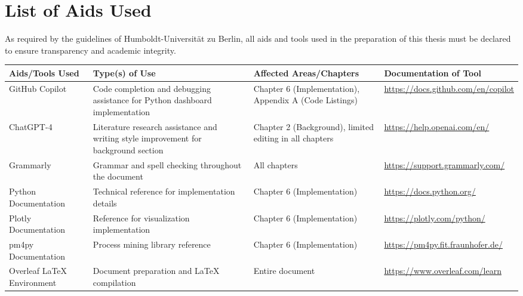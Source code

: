 
\chapter*{List of Aids Used}

As required by the guidelines of Humboldt-Universität zu Berlin, all aids and tools used in the preparation of this thesis must be declared to ensure transparency and academic integrity.

\vspace{1cm}

\begin{longtable}{|p{3cm}|p{4cm}|p{3cm}|p{4cm}|}
\hline
\textbf{Aids/Tools Used} & \textbf{Type(s) of Use} & \textbf{Affected Areas/Chapters} & \textbf{Documentation of Tool} \\
\hline
\endhead

GitHub Copilot & Code completion and debugging assistance for Python dashboard implementation & Chapter 6 (Implementation), Appendix A (Code Listings) & \url{https://docs.github.com/en/copilot} \\
\hline

ChatGPT-4 & Literature research assistance and writing style improvement for background section & Chapter 2 (Background), limited editing in all chapters & \url{https://help.openai.com/en/} \\
\hline

Grammarly & Grammar and spell checking throughout the document & All chapters & \url{https://support.grammarly.com/} \\
\hline

Python Documentation & Technical reference for implementation details & Chapter 6 (Implementation) & \url{https://docs.python.org/} \\
\hline

Plotly Documentation & Reference for visualization implementation & Chapter 6 (Implementation) & \url{https://plotly.com/python/} \\
\hline

pm4py Documentation & Process mining library reference & Chapter 6 (Implementation) & \url{https://pm4py.fit.fraunhofer.de/} \\
\hline

Overleaf LaTeX Environment & Document preparation and LaTeX compilation & Entire document & \url{https://www.overleaf.com/learn} \\
\hline


\end{longtable}

